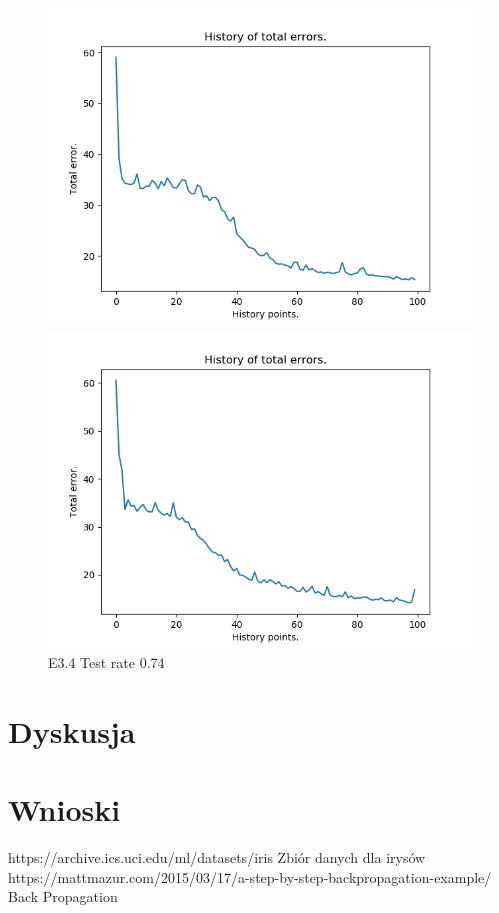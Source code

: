 \documentclass{classrep}
\begin{document}
\begin{figure}[H]
\begin{minipage}{0.5\linewidth}
				\centering
				\includegraphics[scale=0.25]{iris_nn_m7.png}
				\caption{E3.3 Test rate  0.9}
				\label{E3.3}
			\end{minipage}
			\begin{minipage}{0.5\linewidth}
				\centering
				\includegraphics[scale=0.25]{iris_nn_m9.png}
				\caption{E3.4 Test rate  0.74}
				\label{E3.4}
			\end{minipage}
		\end{figure}
		\FloatBarrier
			

\section{Dyskusja}

\section{Wnioski}


\begin{thebibliography}{0}
https://archive.ics.uci.edu/ml/datasets/iris
Zbiór danych dla irysów
https://mattmazur.com/2015/03/17/a-step-by-step-backpropagation-example/
Back Propagation
\end{thebibliography}
\end{document}
